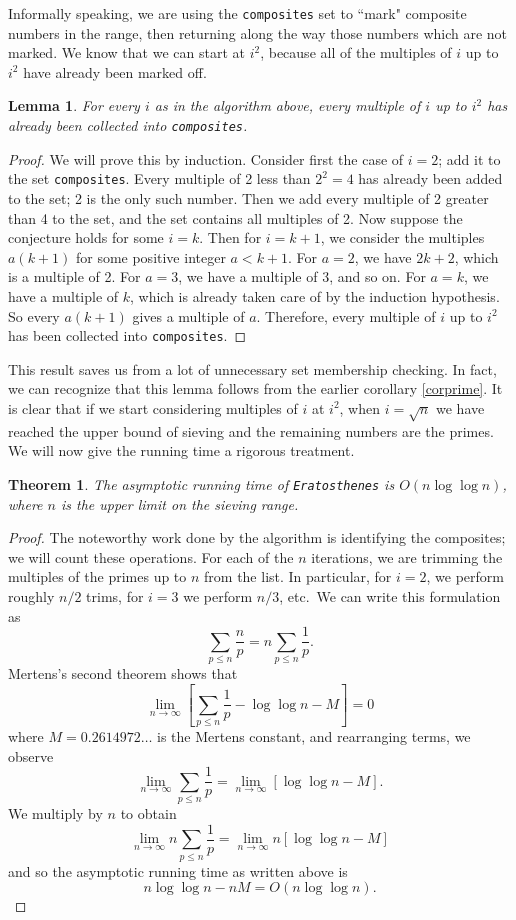 \documentclass{amsart}
\newtheorem{thm}{Theorem}
\newtheorem{lem}{Lemma}
\theoremstyle{definition}
\theoremstyle{case}
\begin{document}
	Informally speaking, we are using the \texttt{composites} set to ``mark" composite numbers in the range, then returning along the way those numbers which are not marked. We know that we can start at $i^2$, because all of the multiples of $i$ up to $i^2$ have already been marked off.
	
	\begin{lem}
		For every $i$ as in the algorithm above, every multiple of $i$ up to $i^2$ has already been collected into \texttt{composites}.
	\end{lem}
	\begin{proof}
		We will prove this by induction. Consider first the case of $i=2$; add it to the set \texttt{composites}. Every multiple of 2 less than $2^2 = 4$ has already been added to the set; 2 is the only such number. Then we add every multiple of 2 greater than 4 to the set, and the set contains all multiples of 2.
		Now suppose the conjecture holds for some $i=k$. Then for $i=k+1$, we consider the multiples $a(k+1)$ for some positive integer $a<k+1$. For $a=2$, we have $2k+2$, which is a multiple of 2. For $a=3$, we have a multiple of 3, and so on. For $a=k$, we have a multiple of $k$, which is already taken care of by the induction hypothesis. So every $a(k+1)$ gives a multiple of $a$. Therefore, every multiple of $i$ up to $i^2$ has been collected into \texttt{composites}.
	\end{proof}
	
	This result saves us from a lot of unnecessary set membership checking. In fact, we can recognize that this lemma follows from the earlier corollary \ref{corprime}. It is clear that if we start considering multiples of $i$ at $i^2$, when $i = \sqrt{n}$ we have reached the upper bound of sieving and the remaining numbers are the primes. We will now give the running time a rigorous treatment.
	
	\begin{thm}\label{runtimethm}
		The asymptotic running time of \texttt{Eratosthenes} is $O(n\log\log n)$, where $n$ is the upper limit on the sieving range.
	\end{thm}
	\begin{proof}
		The noteworthy work done by the algorithm is identifying the composites; we will count these operations. For each of the $n$ iterations, we are trimming the multiples of the primes up to $n$ from the list. In particular, for $i=2$, we perform roughly $n/2$ trims, for $i=3$ we perform $n/3$, etc.\ We can write this formulation as
		$$ \sum_{p\leq n} \frac{n}{p} = n \sum_{p \leq n} \frac{1}{p} . $$
		Mertens's second theorem shows that
		$$ \lim\limits_{n\rightarrow\infty} \left[ \sum_{p \leq n} \frac{1}{p} - \log\log n - M \right] = 0 $$
		where $M=0.2614972\dots$ is the Mertens constant, and rearranging terms, we observe
		$$ \lim\limits_{n\rightarrow\infty} \sum_{p \leq n} \frac{1}{p} = \lim\limits_{n\rightarrow\infty} \left[ \log\log n - M \right] . $$
		We multiply by $n$ to obtain
		$$ \lim\limits_{n\rightarrow\infty} n \sum_{p \leq n} \frac{1}{p} = \lim\limits_{n\rightarrow\infty} n \left[ \log\log n - M \right] $$
		and so the asymptotic running time as written above is
		$$ n \log \log n - nM = O(n\log\log n). $$
	\end{proof}
	
\end{document}
